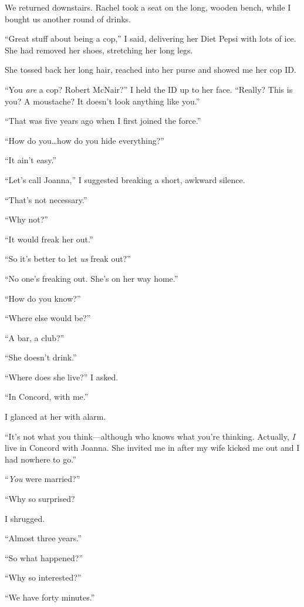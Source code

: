 We returned downstairs. Rachel took a seat on the long, wooden bench,
while I bought us another round of drinks.

``Great stuff about being a cop,'' I said, delivering her Diet Pepsi
with lots of ice. She had removed her shoes, stretching her long legs.

She tossed back her long hair, reached into her purse and showed me her
cop ID.

``You \emph{are} a cop? Robert McNair?'' I held the ID up to her face.
``Really? This is you? A moustache? It doesn't look anything like you.''

``That was five years ago when I first joined the force.''

``How do you\ldots how do you hide everything?''

``It ain't easy.''

``Let's call Joanna,'' I suggested breaking a short, awkward silence.

``That's not necessary.''

``Why not?''

``It would freak her out.''

``So it's better to let \emph{us} freak out?''

``No one's freaking out. She's on her way home.''

``How do you know?''

``Where else would be?''

``A bar, a club?''

``She doesn't drink.''

``Where does she live?'' I asked.

``In Concord, with me.''

I glanced at her with alarm.

``It's not what you think---although who knows what you're thinking.
Actually, \emph{I} live in Concord with Joanna. She invited me in after
my wife kicked me out and I had nowhere to go.''

``\emph{You} were married?''

``Why so surprised?

I shrugged.

``Almost three years.''

``So what happened?''

``Why so interested?''

``We have forty minutes.''

